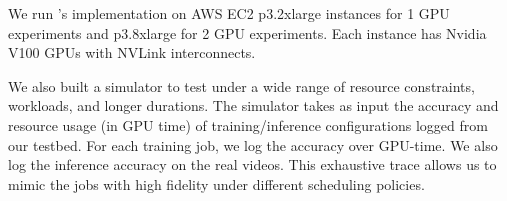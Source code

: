 

We run \name's implementation on AWS EC2 p3.2xlarge instances for 1 GPU experiments and p3.8xlarge for 2 GPU experiments. Each instance has Nvidia V100 GPUs with NVLink interconnects. %

We also built a simulator to %
test \name under a wide range of resource constraints, workloads, and longer durations. 
The simulator takes as input the accuracy and resource usage (in GPU time) of training/inference configurations logged from our testbed. 
For each training job, we log the accuracy over GPU-time. We also log the inference accuracy on the real videos. %
This exhaustive trace allows us to mimic the jobs with high fidelity under different scheduling policies. %


